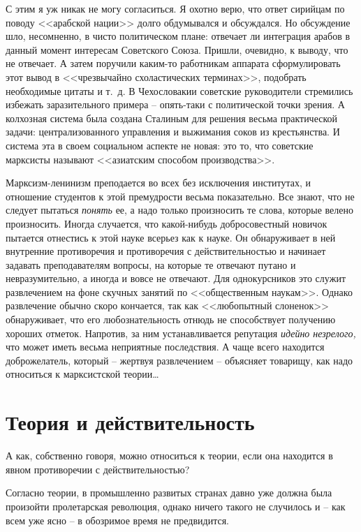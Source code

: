 \documentclass{book}
\begin{document}
С этим я уж никак не могу согласиться. Я охотно верю, что ответ сирийцам по поводу <<арабской нации>> долго обду­мывался и 
обсуждался. Но обсуждение шло, несомненно, в чи­сто политическом плане: отвечает ли интеграция арабов в дан­ный момент интересам 
Советского Союза. Пришли, очевидно, к выводу, что не отвечает. А затем поручили каким-то работ­никам аппарата сформулировать этот 
вывод в <<чрезвычайно схоластических терминах>>, подобрать необходимые цитаты и т.~д. В Чехословакии советские руководители 
стремились из­бежать заразительного примера -- опять-таки с политической точки зрения. А колхозная система была создана Сталиным 
для решения весьма практической задачи: централизованного управления и выжимания соков из крестьянства. И система эта в своем 
социальном аспекте не новая: это то, что совет­ские марксисты называют <<азиатским способом производства>>.

Марксизм-ленинизм преподается во всех без исключения институтах, и отношение студентов к этой премудрости весь­ма показательно.
Все знают, что не следует пытаться \textit{понять} ее, а надо только произносить те слова, которые велено произ­носить. Иногда
случается, что какой-нибудь добросовестный новичок пытается отнестись к этой науке всерьез как к науке. Он обнаруживает в ней
внутренние противоречия и противо­речия с действительностью и начинает задавать преподавате­лям вопросы, на которые те отвечают
путано и невразумитель­но, а иногда и вовсе не отвечают. Для однокурсников это слу­жит развлечением на фоне скучных занятий по
<<общественным наукам>>. Однако развлечение обычно скоро кончается, так как <<любопытный слоненок>> обнаруживает, что его
любозна­тельность отнюдь не способствует получению хороших отметок. Напротив, за ним устанавливается репутация \textit{идейно
незрелого,} что может иметь весьма неприятные последствия. А чаще всего находится доброжелатель, который -- жертвуя развлечением
-- объясняет товарищу, как надо относиться к марксистской теории\ldots


\section{Теория и действительность}

А как, собственно говоря, можно относиться к теории, если она находится в явном противоречии с действительностью?

Согласно теории, в промышленно развитых странах давно уже должна была произойти пролетарская революция, однако ничего такого не 
случилось и -- как всем уже ясно -- в обозримое время не предвидится.
\end{document}
